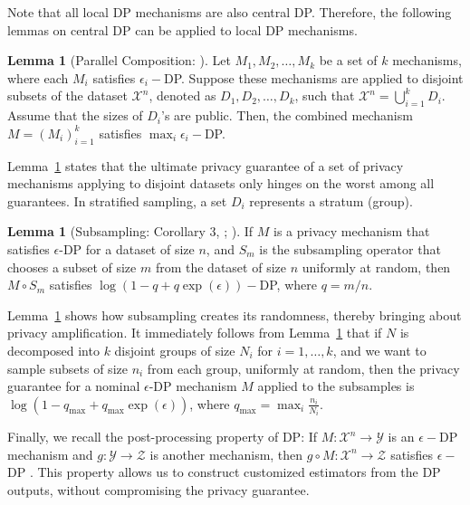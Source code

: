 \documentclass{article}
\newcommand{\ep}{\epsilon}
\theoremstyle{definition}
\newtheorem{lemma}[theorem]{Lemma}
\begin{document}
Note that all local DP mechanisms are also central DP. Therefore, the following lemmas on central DP can be applied to local DP mechanisms.  

\begin{lemma}[Parallel Composition: \citet{mcsherry2009privacy}] \label{lemma: parallel composition}
    Let $M_1, M_2, \dots, M_k$ be a set of $k$ mechanisms, where each $M_i$ satisfies $\epsilon_i-$DP. Suppose these mechanisms are applied to disjoint subsets of the dataset $\mathcal{X}^n$, denoted as $D_1, D_2, \dots, D_k$, such that $\mathcal{X}^n = \bigcup_{i=1}^k D_i$. Assume that the sizes of $D_i$'s are public. Then, the combined mechanism $M = (M_i)_{i=1}^k$ satisfies $\max_i \epsilon_i-$DP.
\end{lemma}

Lemma~\ref{lemma: parallel composition} states that the ultimate privacy guarantee of a set of privacy mechanisms applying to disjoint datasets only hinges on the worst among all guarantees. In stratified sampling, a set $D_i$ represents a stratum (group).

\begin{lemma}[Subsampling: Corollary 3, \citealp{dong2022gaussian}; \citealp{ullman2017}] \label{lemma: subsampling operator}
If $M$ is a privacy mechanism that satisfies $\ep$-DP for a dataset of size $n$, and $S_m$ is the subsampling operator that chooses a subset of size $m$ from the dataset of size $n$ uniformly at random, then $M \circ S_m$ satisfies $\log(1-q+q\exp(\ep))-$DP, where $q=m/n$.
\end{lemma}

Lemma~\ref{lemma: subsampling operator} shows how subsampling creates its randomness, thereby bringing about privacy amplification. It immediately follows from Lemma~\ref{lemma: parallel composition} that if $N$ is decomposed into $k$ disjoint groups of size $N_i$ for $i=1,\ldots, k$, and we want to sample subsets of size $n_i$ from each group, uniformly at random, then the privacy guarantee for a nominal $\ep$-DP mechanism $M$ applied to the subsamples is $\log(1-q_{\max}+q_{\max}\exp(\ep))$, where $q_{\max}=\max_i \frac{n_i}{N_i}$. 

Finally, we recall the post-processing property of DP: If ${M}: \mathcal{X}^n \to \mathcal{Y}$ is an $\epsilon-$DP mechanism and $g: \mathcal{Y} \to \mathcal{Z}$ is another mechanism, then $g \circ {M}: \mathcal{X}^n \to \mathcal{Z}$ satisfies $\epsilon-$DP \citep{dwork2014algorithmic}. This property allows us to construct customized estimators from the DP outputs, without compromising the privacy guarantee.
\end{document}
